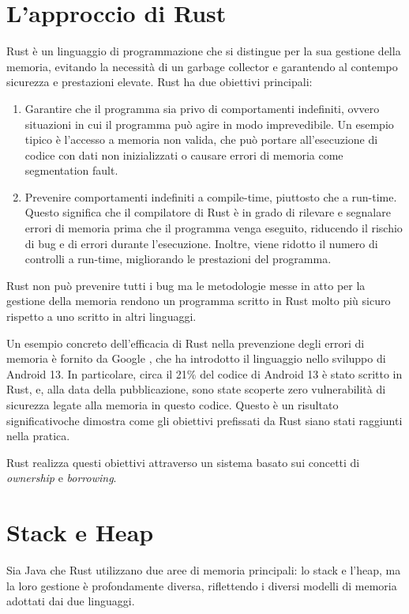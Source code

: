\section{L'approccio di Rust}
Rust è un linguaggio di programmazione che si distingue per la sua gestione della memoria, evitando la necessità di un garbage collector e garantendo al contempo sicurezza e prestazioni elevate. Rust ha due obiettivi principali:
\begin{enumerate}
    \item  Garantire che il programma sia privo di comportamenti indefiniti, ovvero situazioni in cui il programma può agire in modo imprevedibile. Un esempio tipico è l'accesso a memoria non valida, che può portare all'esecuzione di codice con dati non inizializzati o causare errori di memoria come segmentation fault. 
    \item Prevenire comportamenti indefiniti a compile-time, piuttosto che a run-time. Questo significa che il compilatore di Rust è in grado di rilevare e segnalare errori di memoria prima che il programma venga eseguito, riducendo il rischio di bug e di errori durante l'esecuzione. Inoltre, viene ridotto il numero di controlli a run-time, migliorando le prestazioni del programma. 
\end{enumerate}
Rust non può prevenire tutti i bug ma le metodologie messe in atto per la gestione della memoria rendono un programma scritto in Rust molto più sicuro rispetto a uno scritto in altri linguaggi. 

Un esempio concreto dell'efficacia di Rust nella prevenzione degli errori di memoria è fornito da Google \cite{android13-memorysafe}, che ha introdotto il linguaggio nello sviluppo di Android 13. In particolare, circa il 21\% del codice di Android 13 è stato scritto in Rust, e, alla data della pubblicazione, sono state scoperte zero vulnerabilità di sicurezza legate alla memoria in questo codice. Questo è un risultato significativoche dimostra come gli obiettivi prefissati da Rust siano stati raggiunti nella pratica.

Rust realizza questi obiettivi attraverso un sistema basato sui concetti di \textit{ownership} e \textit{borrowing}. 

\section{Stack e Heap}
Sia Java che Rust utilizzano due aree di memoria principali: lo stack e l'heap, ma la loro gestione è profondamente diversa, riflettendo i diversi modelli di memoria adottati dai due linguaggi.

